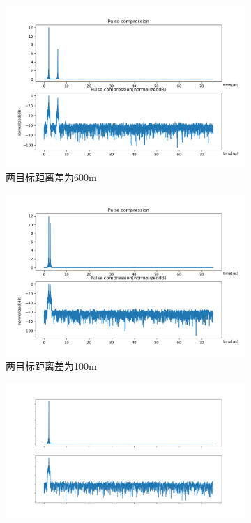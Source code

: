 \documentclass{article}
\newcounter{sub}
\begin{document}
\begin{figure}[H]
	\centering
	\begin{subfigure}[H]{.45\linewidth}
		\centering
		\includegraphics[width=\linewidth]{distance600-pulse-software.png}
		\caption{两目标距离差为600m}
		\label{fig:两目标距离差为600m}
	\end{subfigure}
	\quad
	\begin{subfigure}[H]{.45\linewidth}
		\centering
		\includegraphics[width=\linewidth]{distance100-pulse-software.png}
		\caption{两目标距离差为100m}
		\label{fig:两目标距离差为100m}
	\end{subfigure}
	\quad
	\begin{subfigure}[H]{.45\linewidth}
		\centering
		\includegraphics[width=\linewidth]{distance10-pulse-software.png}

\end{subfigure}
\end{figure}
\end{document}

